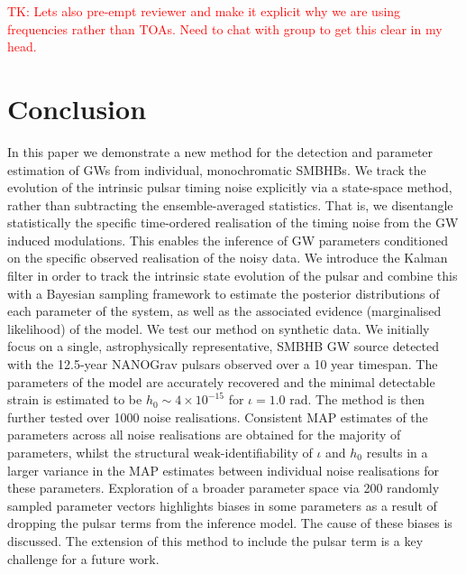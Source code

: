 \documentclass[fleqn,usenatbib,useAMS]{mnras}
\begin{document}
\textcolor{red}{TK: Lets also pre-empt reviewer and make it explicit why we are using frequencies rather than TOAs. Need to chat with group to get this clear in my head.}


\section{Conclusion}
In this paper we demonstrate a new method for the detection and parameter estimation of GWs from individual, monochromatic SMBHBs. We track the evolution of the intrinsic pulsar timing noise explicitly via a state-space method, rather than subtracting the ensemble-averaged statistics. That is, we disentangle statistically the specific time-ordered realisation of the timing noise from the GW induced modulations. This enables the inference of GW parameters conditioned on the specific observed realisation of the noisy data. We introduce the Kalman filter in order to track the intrinsic state evolution of the pulsar and combine this with a Bayesian sampling framework to estimate the posterior distributions of each parameter of the system, as well as the associated evidence (marginalised likelihood) of the model. We test our method on synthetic data. We initially focus on a single, astrophysically representative, SMBHB GW source detected with the 12.5-year NANOGrav pulsars observed over a 10 year timespan. The parameters of the model are accurately recovered and the minimal detectable strain is estimated to be $h_0 \sim 4 \times 10^{-15}$ for $\iota=1.0$ rad. The method is then further tested over 1000 noise realisations. Consistent MAP estimates of the parameters across all noise realisations are obtained for the majority of parameters, whilst the structural weak-identifiability of $\iota$ and $h_0$ results in a larger variance in the MAP estimates between individual noise realisations for these parameters. Exploration of a broader parameter space via 200 randomly sampled parameter vectors highlights biases in some parameters as a result of dropping the pulsar terms from the inference model. The cause of these biases is discussed. The extension of this method to include the pulsar term is a key challenge for a future work.
 
\appendix
\newpage
\end{document}
